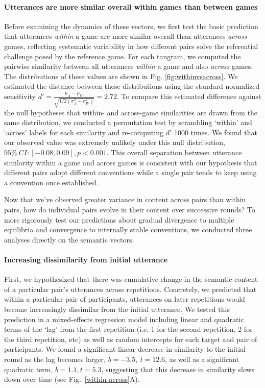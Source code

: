 \paragraph{Utterances are more similar overall within games than between games}  
Before examining the dynamics of these vectors, we first test the basic prediction that utterances \emph{within} a game are more similar overall than utterances \emph{across} games, reflecting systematic variability in how different pairs solve the referential challenge posed by the reference game.
For each tangram, we computed the pairwise similarity between all utterances \emph{within} a game and also \emph{across} games. 
The distributions of these values are shown in Fig. \ref{fig:withinvsacross}.
We estimated the distance between these distributions using the standard normalized sensitivity $d' = \frac{\mu_A - \mu_W}{\sqrt{1/2(\sigma^2_A+\sigma^2_W)}} = 2.72$.
To compare this estimated difference against the null hypotheses that within- and across-game similarities are drawn from the same distribution, we conducted a permutation test by scrambling `within' and `across' labels for each similarity and re-computing $d'$ 1000 times. 
We found that our observed value was extremely unlikely under this null distribution, $95\%~CI: [-0.08, 0.09], p < 0.001$. 
This overall separation between utterance similarity within a game and across games is consistent with our hypothesis that different pairs adopt different conventions while a single pair tends to keep using a convention once established.

Now that we've observed greater variance in content across pairs than within pairs, how do individual pairs evolve in their content over successive rounds?
To more rigorously test our predictions about gradual divergence to multiple equilibria and convergence to internally stable conventions, we conducted three analyses directly on the semantic vectors.

\paragraph{Increasing dissimilarity from initial utterance}

First, we hypothesized that there was cumulative change in the semantic content of a particular pair's utterances across repetitions.
Concretely, we predicted that within a particular pair of participants, utterances on later repetitions would become increasingly dissimilar from the initial utterance.
We tested this prediction in a mixed-effects regression model including linear and quadratic terms of the `lag' from the first repetition (i.e. 1 for the second repetition, 2 for the third repetition, etc) as well as random intercepts for each target and pair of participants.
We found a significant linear decrease in similarity to the initial round as the lag becomes larger, $b = -3.5,~t = 12.6$, as well as a significant quadratic term, $b=1.1, t=5.3$, suggesting that this decrease in similarity slows down over time (see Fig.~\ref{within-across}A).

